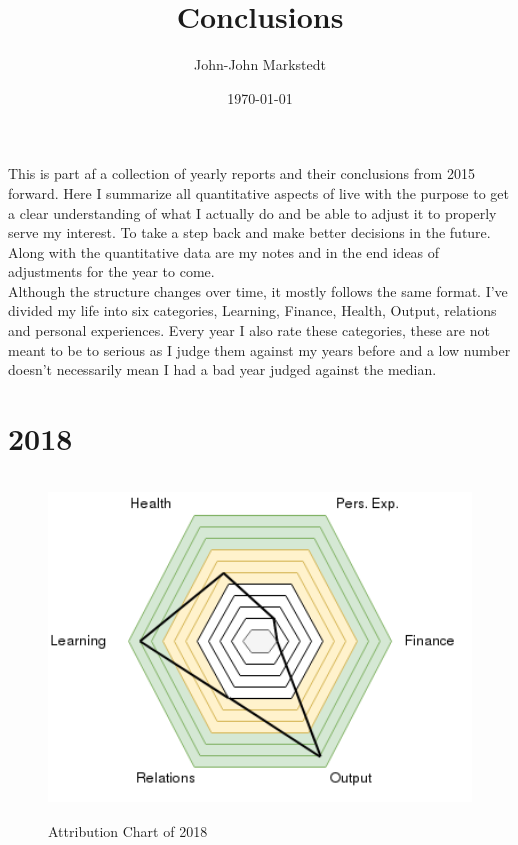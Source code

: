 \documentclass[a4paper]{article}
\title{Conclusions}
\author{John-John Markstedt}
\date{\today}
\begin{document}
\maketitle

This is part af a collection of yearly reports and their conclusions from 2015 forward. Here I summarize all quantitative aspects of live with the purpose to get a clear understanding of what I actually do and be able to adjust it to properly serve my interest. To take a step back and make better decisions in the future. Along with the quantitative data are my notes and in the end ideas of adjustments for the year to come. \\
   Although the structure changes over time, it mostly follows the same format. I've divided my life into six categories, Learning, Finance, Health, Output, relations and personal experiences. Every year I also rate these categories, these are not meant to be to serious as I judge them against my years before and a low number doesn't necessarily mean I had a bad year judged against the median. 


\clearpage

\section{2018}

\begin{figure}[h!]
  \includegraphics[height=255pt]{Attributes_Chart_2018.png}
  \caption{Attribution Chart of 2018}
  \label{fig:2018}
\end{figure} 
\end{document}
